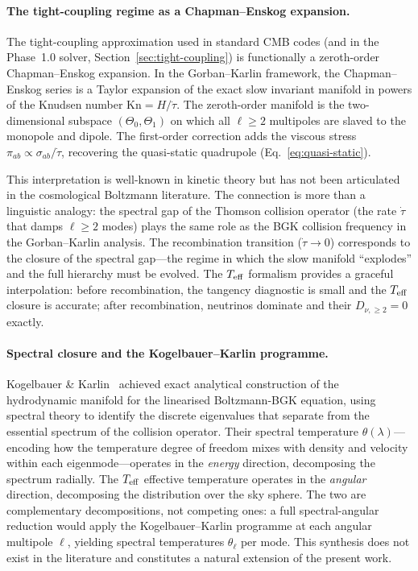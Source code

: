 \paragraph{The tight-coupling regime as a Chapman--Enskog
expansion.}

The tight-coupling approximation used in standard CMB
codes (and in the Phase~1.0 solver,
Section~\ref{sec:tight-coupling}) is functionally a
zeroth-order Chapman--Enskog expansion.  In the
Gorban--Karlin framework, the Chapman--Enskog series is
a Taylor expansion of the exact slow invariant manifold
in powers of the Knudsen number
$\mathrm{Kn} = H/\dot{\tau}$.  The zeroth-order
manifold is the two-dimensional subspace
$(\Theta_0, \Theta_1)$ on which all $\ell \geq 2$
multipoles are slaved to the monopole and dipole.  The
first-order correction adds the viscous stress
$\pi_{ab} \propto \sigma_{ab}/\dot{\tau}$, recovering
the quasi-static quadrupole
(Eq.~\ref{eq:quasi-static}).

This interpretation is well-known in kinetic theory but
has not been articulated in the cosmological Boltzmann
literature.  The connection is more than a linguistic
analogy: the spectral gap of the Thomson collision
operator (the rate $\dot{\tau}$ that damps
$\ell \geq 2$ modes) plays the same role as the BGK
collision frequency in the Gorban--Karlin analysis.  The
recombination transition ($\dot{\tau} \to 0$)
corresponds to the closure of the spectral gap---the
regime in which the slow manifold ``explodes'' and the
full hierarchy must be evolved.  The $T_{\mathrm{eff}}$ formalism
provides a graceful interpolation: before recombination,
the tangency diagnostic is small and the $T_{\mathrm{eff}}$ closure
is accurate; after recombination, neutrinos dominate
and their $D_{\nu,\geq 2} = 0$ exactly.


\paragraph{Spectral closure and the Kogelbauer--Karlin
programme.}

Kogelbauer \& Karlin~\cite{KogelbauerKarlin2024}
achieved exact analytical construction of the
hydrodynamic manifold for the linearised Boltzmann-BGK
equation, using spectral theory to identify the discrete
eigenvalues that separate from the essential spectrum of
the collision operator.  Their spectral temperature
$\theta(\lambda)$---encoding how the temperature degree
of freedom mixes with density and velocity within each
eigenmode---operates in the \emph{energy} direction,
decomposing the spectrum radially.  The $T_{\mathrm{eff}}$ effective
temperature operates in the \emph{angular} direction,
decomposing the distribution over the sky sphere.  The
two are complementary decompositions, not competing
ones: a full spectral-angular reduction would apply the
Kogelbauer--Karlin programme at each angular multipole
$\ell$, yielding spectral temperatures $\theta_\ell$ per
mode.  This synthesis does not exist in the literature and
constitutes a natural extension of the present work.


